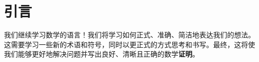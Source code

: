 \section{引言}

我们继续学习数学的语言！我们将学习如何正式、准确、简洁地表达我们的想法。这需要学习一些新的术语和符号，同时以更正式的方式思考和书写。最终，这将使我们能够更好地解决问题并写出良好、清晰且正确的数学\textbf{证明}。







